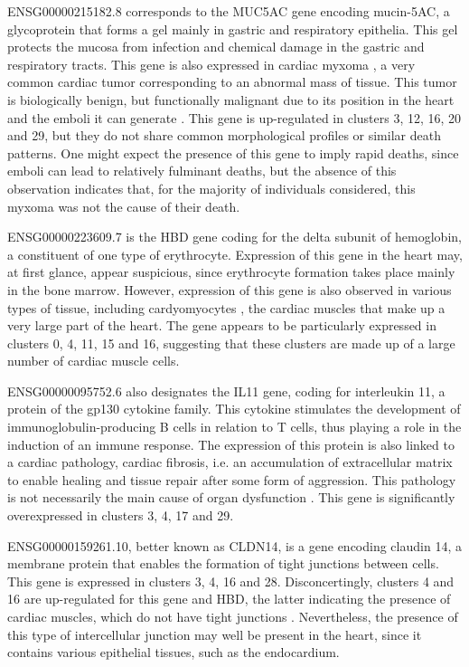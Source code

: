 \documentclass[a4paper, 11pt]{article}
\begin{document}
\begin{multicols}{2}
ENSG00000215182.8 corresponds to the MUC5AC gene encoding mucin-5AC, a glycoprotein that forms a gel mainly in gastric and respiratory epithelia. This gel protects the mucosa from infection and chemical damage in the gastric and respiratory tracts. This gene is also expressed in cardiac myxoma \citep{Islam2022}, a very common cardiac tumor corresponding to an abnormal mass of tissue. This tumor is biologically benign, but functionally malignant due to its position in the heart and the emboli it can generate  \citep{Chu2004}. This gene is up-regulated in clusters 3, 12, 16, 20 and 29, but they do not share common morphological profiles or similar death patterns. One might expect the presence of this gene to imply rapid deaths, since emboli can lead to relatively fulminant deaths, but the absence of this observation indicates that, for the majority of individuals considered, this myxoma was not the cause of their death. 

ENSG00000223609.7 is the HBD gene coding for the delta subunit of hemoglobin, a constituent of one type of erythrocyte. Expression of this gene in the heart may, at first glance, appear suspicious, since erythrocyte formation takes place mainly in the bone marrow. However, expression of this gene is also observed in various types of tissue, including cardyomyocytes  \citep{Keller2022}, the cardiac muscles that make up a very large part of the heart. The gene appears to be particularly expressed in clusters 0, 4, 11, 15 and 16, suggesting that these clusters are made up of a large number of cardiac muscle cells. 

ENSG00000095752.6 also designates the IL11 gene, coding for interleukin 11, a protein of the gp130 cytokine family. This cytokine stimulates the development of immunoglobulin-producing B cells in relation to T cells, thus playing a role in the induction of an immune response. The expression of this protein is also linked to a cardiac pathology, cardiac fibrosis, i.e. an accumulation of extracellular matrix to enable healing and tissue repair after some form of aggression. This pathology is not necessarily the main cause of organ dysfunction  \citep{Sweeney2023}. This gene is significantly overexpressed in clusters 3, 4, 17 and 29.

ENSG00000159261.10, better known as CLDN14, is a gene encoding claudin 14, a membrane protein that enables the formation of tight junctions between cells. This gene is expressed in clusters 3, 4, 16 and 28. Disconcertingly, clusters 4 and 16 are up-regulated for this gene and HBD, the latter indicating the presence of cardiac muscles, which do not have tight junctions  \citep{Severs1985}. Nevertheless, the presence of this type of intercellular junction may well be present in the heart, since it contains various epithelial tissues, such as the endocardium.


\end{multicols}
\end{document}
